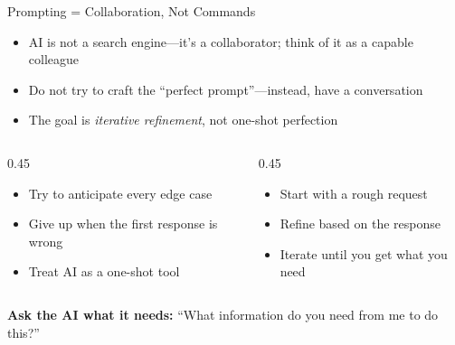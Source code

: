 \documentclass[aspectratio=169]{beamer}
\begin{document}
\begin{frame}{Prompting = Collaboration, Not Commands}
\begin{itemize}
  \item AI is not a search engine---it's a \alert{collaborator}; think of it as a capable colleague
  \item Do not try to craft the ``perfect prompt''---instead, have a \alert{conversation}
  \item The goal is \textit{iterative refinement}, not one-shot perfection
\end{itemize}

\vspace{0.3cm}

\begin{columns}[T]
\begin{column}{0.45\textwidth}
\begin{shadedbox}[title=\textbf{Don't Do This}]
\begin{itemize}\small
  \item Try to anticipate every edge case
  \item Give up when the first response is wrong
  \item Treat AI as a one-shot tool
\end{itemize}
\end{shadedbox}
\end{column}
\begin{column}{0.45\textwidth}
\begin{shadedbox}[title=\textbf{Do This Instead}]
\begin{itemize}\small
  \item Start with a rough request
  \item Refine based on the response
  \item Iterate until you get what you need
\end{itemize}
\end{shadedbox}
\end{column}
\end{columns}

\vspace{0.3cm}
\textbf{Ask the AI what it needs:} ``What information do you need from me to do this?''
\end{frame}
\end{document}
